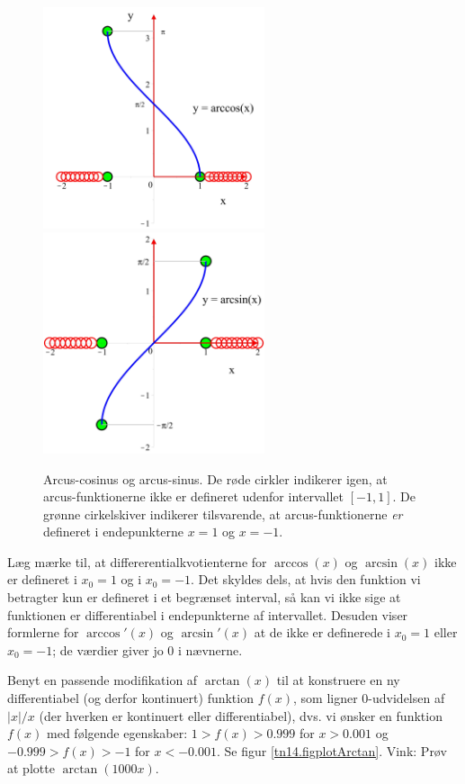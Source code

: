 \begin{figure}[h]
\centerline{\includegraphics[width=65mm]{FIGS/plotArccos.pdf} \quad \quad  \includegraphics[width=65mm]{FIGS/plotArcsin.pdf}}
\begin{center}
\caption{Arcus-cosinus og arcus-sinus. De røde cirkler indikerer igen, at arcus-funktionerne ikke er defineret udenfor intervallet $[-1, 1]$. De grønne cirkelskiver indikerer tilsvarende, at arcus-funktionerne \emph{er} defineret i endepunkterne $x=1$ og $x=-1$.} \label{tn14.figplotArccossin}
\end{center}
\end{figure}



\begin{aha}
Læg mærke til, at differerentialkvotienterne for $\arccos(x)$ og $\arcsin(x)$ ikke er defineret i $x_{0}=1$ og i $x_{0}=-1$. Det skyldes dels, at hvis den funktion vi betragter kun er defineret i et begrænset interval, så kan vi ikke sige at funktionen er differentiabel i endepunkterne af intervallet. Desuden viser formlerne for  $\arccos'(x)$ og $\arcsin'(x)$ at de ikke er definerede i  $x_{0}= 1$ eller $x_{0}= -1$; de værdier giver jo $0$ i nævnerne.
\end{aha}


\begin{exercise}
Benyt en passende modifikation af $\arctan(x)$ til at konstruere en ny differentiabel (og derfor kontinuert) funktion $f(x)$, som ligner $0$-udvidelsen af $|x|/x$ (der hverken er kontinuert eller differentiabel), dvs. vi ønsker en funktion $f(x)$ med følgende egenskaber: $1> f(x) > 0.999$ for $x > 0.001$ og $-0.999 > f(x) > -1$ for $x < -0.001$. Se figur \ref{tn14.figplotArctan}.
Vink: Prøv at plotte $\arctan(1000x)$.
\end{exercise}


